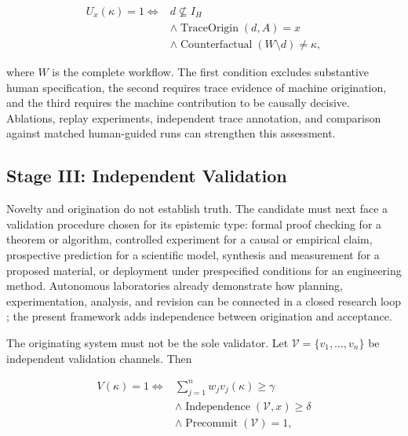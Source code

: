 \begin{equation}
\begin{aligned}
U_x(\kappa)=1
\Longleftrightarrow{}&
d\not\subseteq I_H\\
&\land
\operatorname{TraceOrigin}(d,A)=x\\
&\land
\operatorname{Counterfactual}(W\setminus d)
\neq \kappa,
\end{aligned}
\label{eq:unknown_unknown_origination}
\end{equation}

where $W$ is the complete workflow. The first condition excludes substantive
human specification, the second requires trace evidence of machine
origination, and the third requires the machine contribution to be causally
decisive. Ablations, replay experiments, independent trace annotation, and
comparison against matched human-guided runs can strengthen this assessment.

\subsection{\textbf{Stage III: Independent Validation}}

Novelty and origination do not establish truth. The candidate must next face a
validation procedure chosen for its epistemic type: formal proof checking for
a theorem or algorithm, controlled experiment for a causal or empirical claim,
prospective prediction for a scientific model, synthesis and measurement for
a proposed material, or deployment under prespecified conditions for an
engineering method. Autonomous laboratories already demonstrate how planning,
experimentation, analysis, and revision can be connected in a closed research
loop \cite{king2004robot,king2009automation,boiko2023autonomous}; the present
framework adds independence between origination and acceptance.

The originating system must not be the sole validator. Let
$\mathcal{V}=\{v_1,\ldots,v_n\}$ be independent validation channels. Then

\begin{equation}
\begin{aligned}
V(\kappa)=1
\Longleftrightarrow{}&
\sum_{j=1}^{n}w_jv_j(\kappa)\geq\gamma\\
&\land
\operatorname{Independence}(\mathcal{V},x)\geq\delta\\
&\land
\operatorname{Precommit}(\mathcal{V})=1,
\end{aligned}
\label{eq:independent_validation}
\end{equation}

